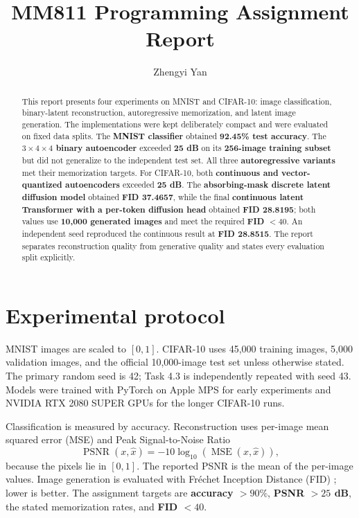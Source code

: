 \documentclass[11pt]{article}
\title{MM811 Programming Assignment Report}
\author{Zhengyi Yan}
\date{}
\newcommand{\keydata}[1]{\textbf{#1}}
\newcommand{\keyarch}[1]{\textcolor{codeblue}{\textbf{#1}}}
\begin{document}
\maketitle

\begin{abstract}
This report presents four experiments on MNIST and CIFAR-10: image classification, binary-latent reconstruction, autoregressive memorization, and latent image generation. The implementations were kept deliberately compact and were evaluated on fixed data splits. The \keyarch{MNIST classifier} obtained \keydata{92.45\% test accuracy}. The \keyarch{$3\times4\times4$ binary autoencoder} exceeded \keydata{25 dB} on its \keydata{256-image training subset} but did not generalize to the independent test set. All three \keyarch{autoregressive variants} met their memorization targets. For CIFAR-10, both \keyarch{continuous and vector-quantized autoencoders} exceeded \keydata{25 dB}. The \keyarch{absorbing-mask discrete latent diffusion model} obtained \keydata{FID 37.4657}, while the final \keyarch{continuous latent Transformer with a per-token diffusion head} obtained \keydata{FID 28.8195}; both values use \keydata{10,000 generated images} and meet the required \keydata{FID $<40$}. An independent seed reproduced the continuous result at \keydata{FID 28.8515}. The report separates reconstruction quality from generative quality and states every evaluation split explicitly.
\end{abstract}

\section{Experimental protocol}

MNIST images are scaled to $[0,1]$. CIFAR-10 uses 45,000 training images, 5,000 validation images, and the official 10,000-image test set unless otherwise stated. The primary random seed is 42; Task 4.3 is independently repeated with seed 43. Models were trained with PyTorch on Apple MPS for early experiments and NVIDIA RTX 2080 SUPER GPUs for the longer CIFAR-10 runs.

Classification is measured by accuracy. Reconstruction uses per-image mean squared error (MSE) and Peak Signal-to-Noise Ratio
\begin{equation}
    \operatorname{PSNR}(x,\hat{x})=-10\log_{10}\left(\operatorname{MSE}(x,\hat{x})\right),
\end{equation}
because the pixels lie in $[0,1]$. The reported PSNR is the mean of the per-image values. Image generation is evaluated with Fr\'{e}chet Inception Distance (FID) \cite{heusel2017fid}; lower is better. The assignment targets are \keydata{accuracy $>90\%$}, \keydata{PSNR $>25$ dB}, the stated memorization rates, and \keydata{FID $<40$}.
\end{document}
